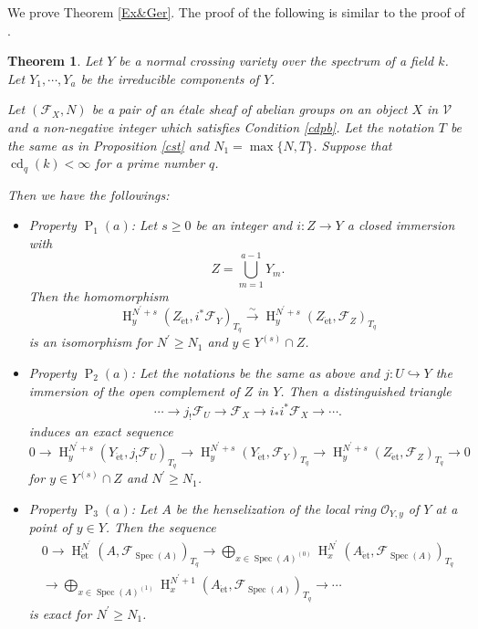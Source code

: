 \documentclass{article}
\newtheorem{thm}{\indent \sc Theorem}[section]
\newcommand{\spec}{\operatorname{Spec}}
\newcommand{\et}{\mathrm{\acute{e}t}}
\newcommand{\HO}{\operatorname{H}}
\begin{document}
We prove Theorem \ref{Ex&Ger}. The proof of the following is similar to the proof of
\cite[Theorem 1.3]{Sak5}.

%
\begin{thm}\upshape\label{1gerl}
Let $Y$ be a normal crossing variety over 
the spectrum of a field $k$.
Let 
%
\begin{math}
Y_{1}, \cdots, Y_{a}
\end{math}
%
be the irreducible components of $Y$.

Let $(\mathcal{F}_{X}, N)$ be a pair of
an \'{e}tale sheaf of abelian groups
on an object $X$ in $\mathcal{V}$ 
and a non-negative integer
which satisfies 
Condition \ref{cdpb}. 
Let the notation $T$ be the same as in Proposition \ref{cst}
and $N_{1}=\operatorname{max}\{N, T\}$.
Suppose that
$\operatorname{cd}_{q}(k)<\infty$ for a prime number $q$.


Then we have the followings:

%
\begin{itemize}
%
\item Property $\operatorname{P}_{1}(a)$:
Let $s\geq 0$ be an integer and
$i: Z\to Y$ a closed immersion with
%
\begin{equation*}
Z
=
\displaystyle\bigcup^{a-1}_{m=1} Y_{m}.
\end{equation*}
%
Then the homomorphism
%
\begin{equation*}
\HO^{N^{\prime}+s}_{y}(
Z_{\et},
i^{*}\mathcal{F}_{Y}
)_{T_{q}}    
\xrightarrow{\sim}
\HO^{N^{\prime}+s}_{y}(
Z_{\et},
\mathcal{F}_{Z}
)_{T_{q}}
\end{equation*}
%
is an isomorphism for
$N^{\prime}\geq N_{1}$ and
$y\in Y^{(s)}\cap Z$.
%
\item Property $\operatorname{P}_{2}(a)$:
Let the notations be the same as above
and $j: U\hookrightarrow Y$ the immersion
of the open complement
of $Z$ in $Y$.
Then 
a distinguished triangle
%
\begin{align}\label{Indisji}
\cdots\to  
j_{!}\mathcal{F}_{U}
\to
\mathcal{F}_{X}
\to
i_{*}i^{*}\mathcal{F}_{X}
\to\cdots.
\end{align}
%
induces an exact sequence
%
\begin{equation}\label{Inindij}
0\to
\HO^{N^{\prime}+s}_{y}(
Y_{\et}, j_{!}\mathcal{F}_{U}
)_{T_{q}}
\to
\HO^{N^{\prime}+s}_{y}(
Y_{\et}, 
\mathcal{F}_{Y}
)_{T_{q}}
\to 
\HO^{N^{\prime}+s}_{y}(Z_{\et},
\mathcal{F}_{Z})_{T_{q}}
\to 0
\end{equation}
%
for $y\in Y^{(s)}\cap Z$ and $N^{\prime}\geq N_{1}$. 

%
\item Property $\operatorname{P}_{3}(a)$: Let $A$ be the henselization of the local ring
$\mathcal{O}_{Y, y}$ of $Y$ at a point of $y\in Y$. Then
the sequence
%
\begin{align*}
0\to \HO^{N^{\prime}}_{\et}(A, \mathcal{F}_{\spec(A)})_{T_{q}}
\to
\bigoplus_{x\in \spec(A)^{(0)}}
\HO^{N^{\prime}}_{x}(A_{\et}, 
\mathcal{F}_{\spec(A)})_{T_{q}}
\\
\to
\bigoplus_{x\in \spec(A)^{(1)}}
\HO^{N^{\prime}+1}_{x}(A_{\et}, 
\mathcal{F}_{\spec(A)})_{T_{q}} 
\to
\cdots
\end{align*}
%
is exact for $N^{\prime}\geq N_{1}$.
%
\end{itemize}
%
\end{thm}
\end{document}
